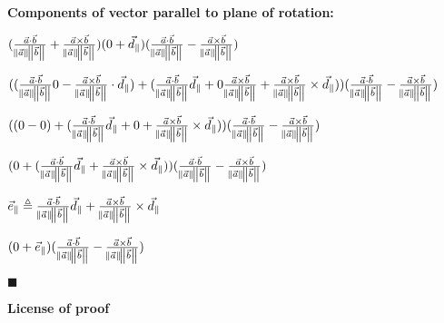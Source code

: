 \documentclass[12pt]{article}
\renewcommand{\qed}{\hfill$\blacksquare$}
\renewenvironment{proof}{\begin{addmargin}[1em]{0em}\begin{newproof}}{\end{newproof}\end{addmargin}\qed}
\begin{document}
\begin{proof}

\textbf{Components of vector parallel to plane of rotation: }

$ (\frac{\vec{a} \cdot \vec{b}}{\norm{\vec{a}}\norm{\vec{b}}} + \frac{\vec{a} \times \vec{b}}{\norm{\vec{a}}\norm{\vec{b}}})(0+\vec{d}_{\parallel})(\frac{\vec{a} \cdot \vec{b}}{\norm{\vec{a}}\norm{\vec{b}}} - \frac{\vec{a} \times \vec{b}}{\norm{\vec{a}}\norm{\vec{b}}})   $



$ (
    ({\frac{\vec{a} \cdot \vec{b}}{\norm{\vec{a}}\norm{\vec{b}}}}{0} - \frac{\vec{a} \times \vec{b}}{\norm{\vec{a}}\norm{\vec{b}}} \cdot \vec{d}_{\parallel} )  +
(
\frac{\vec{a} \cdot \vec{b}}{\norm{\vec{a}}\norm{\vec{b}}}\vec{d}_{\parallel} +
{0}\frac{\vec{a} \times \vec{b}}{\norm{\vec{a}}\norm{\vec{b}}} +
\frac{\vec{a} \times \vec{b}}{\norm{\vec{a}}\norm{\vec{b}}} \times \vec{d}_{\parallel}
)
)
(\frac{\vec{a} \cdot \vec{b}}{\norm{\vec{a}}\norm{\vec{b}}} - \frac{\vec{a} \times \vec{b}}{\norm{\vec{a}}\norm{\vec{b}}}) $


$ (
    (0 - 0 )  +
(
\frac{\vec{a} \cdot \vec{b}}{\norm{\vec{a}}\norm{\vec{b}}}\vec{d}_{\parallel} +
0 +
\frac{\vec{a} \times \vec{b}}{\norm{\vec{a}}\norm{\vec{b}}} \times \vec{d}_{\parallel}
)
)
(\frac{\vec{a} \cdot \vec{b}}{\norm{\vec{a}}\norm{\vec{b}}} - \frac{\vec{a} \times \vec{b}}{\norm{\vec{a}}\norm{\vec{b}}}) $



$ ( 0 + (
\frac{\vec{a} \cdot \vec{b}}{\norm{\vec{a}}\norm{\vec{b}}}\vec{d}_{\parallel} +
\frac{\vec{a} \times \vec{b}}{\norm{\vec{a}}\norm{\vec{b}}} \times \vec{d}_{\parallel}
)) (\frac{\vec{a} \cdot \vec{b}}{\norm{\vec{a}}\norm{\vec{b}}} - \frac{\vec{a} \times \vec{b}}{\norm{\vec{a}}\norm{\vec{b}}}) $



$ \vec{e}_{\parallel} \triangleq \frac{\vec{a} \cdot \vec{b}}{\norm{\vec{a}}\norm{\vec{b}}}\vec{d}_{\parallel} +
\frac{\vec{a} \times \vec{b}}{\norm{\vec{a}}\norm{\vec{b}}} \times \vec{d}_{\parallel} $



$ (0 + \vec{e}_{\parallel}) (\frac{\vec{a} \cdot \vec{b}}{\norm{\vec{a}}\norm{\vec{b}}} - \frac{\vec{a} \times \vec{b}}{\norm{\vec{a}}\norm{\vec{b}}}) $




\end{proof}



\textbf{License of proof }
\end{document}
